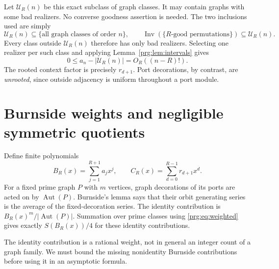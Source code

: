 \documentclass[11pt,letterpaper]{article}
\numberwithin{equation}{section}
\theoremstyle{definition}\newtheorem{definition}[theorem]{Definition}
\theoremstyle{remark}\newtheorem{remark}[theorem]{Remark}
\DeclareMathOperator{\Aut}{Aut}
\DeclareMathOperator{\Inv}{Inv}
\begin{document}
Let $\mathcal U_R(n)$ be this exact subclass of graph classes. It
may contain graphs with some bad realizers. No converse goodness
assertion is needed. The two inclusions used are simply
\[
 \mathcal U_R(n)\subseteq\{\text{all graph classes of order }n\},
 \qquad
 \Inv(\{R\text{-good permutations}\})\subseteq\mathcal U_R(n).
\]
Every class outside $\mathcal U_R(n)$ therefore has only bad
realizers. Selecting one realizer per such class and applying
Lemma~\ref{prg:lem:intervals} gives
\begin{equation}\label{prg:eq:subclasserror}
 0\leq a_n-|\mathcal U_R(n)|=O_R((n-R)!).
\end{equation}
The rooted context factor is precisely $r_{d+1}$. Port decorations,
by contrast, are \emph{unrooted}, since outside adjacency is uniform
throughout a port module.

\section{Burnside weights and negligible symmetric quotients}\label{prg:sec:symmetry}

Define finite polynomials
\begin{equation}\label{prg:eq:BC}
 B_R(x)=\sum_{j=1}^{R+1}a_jx^j,\qquad
 C_R(x)=\sum_{d=0}^{R-1}r_{d+1}x^d.
\end{equation}
For a fixed prime graph $P$ with $m$ vertices, graph decorations of
its ports are acted on by $\Aut(P)$. Burnside's lemma says that
their orbit generating series is the average of the fixed-decoration
series. The identity contribution is
$B_R(x)^m/|\Aut(P)|$. Summation over prime classes using
\eqref{prg:eq:weighted} gives exactly $S(B_R(x))/4$ for these identity
contributions.

The identity contribution is a rational weight, not in general an
integer count of a graph family. We must bound the missing
nonidentity Burnside contributions before using it in an
asymptotic formula.
\end{document}
